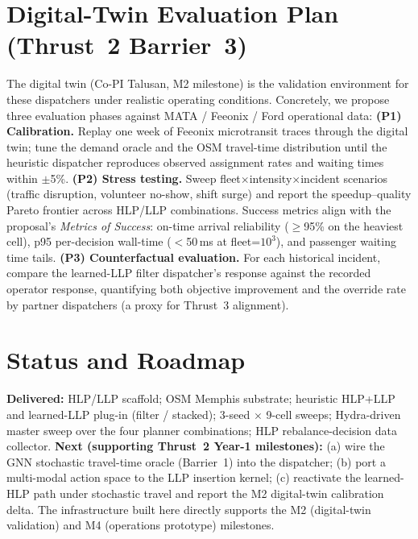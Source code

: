 \documentclass[11pt]{article}
\begin{document}
\section{Digital-Twin Evaluation Plan (Thrust~2 Barrier~3)}
The digital twin (Co-PI Talusan, M2 milestone) is the validation
environment for these dispatchers under realistic operating conditions.
Concretely, we propose three evaluation phases against MATA / Feeonix /
Ford operational data:
\textbf{(P1) Calibration.} Replay one week of Feeonix microtransit traces
through the digital twin; tune the demand oracle and the OSM travel-time
distribution until the heuristic dispatcher reproduces observed assignment
rates and waiting times within $\pm$5\%.
\textbf{(P2) Stress testing.} Sweep fleet$\times$intensity$\times$incident
scenarios (traffic disruption, volunteer no-show, shift surge) and report
the speedup--quality Pareto frontier across HLP/LLP combinations. Success
metrics align with the proposal's \textit{Metrics of Success}: on-time
arrival reliability ($\geq$95\% on the heaviest cell), p95 per-decision
wall-time ($<$50\,ms at fleet=$10^3$), and passenger waiting time tails.
\textbf{(P3) Counterfactual evaluation.} For each historical incident,
compare the learned-LLP filter dispatcher's response against the recorded
operator response, quantifying both objective improvement and the
override rate by partner dispatchers (a proxy for Thrust~3 alignment).

\section{Status and Roadmap}
\textbf{Delivered:} HLP/LLP scaffold; OSM Memphis substrate; heuristic
HLP+LLP and learned-LLP plug-in (filter / stacked); 3-seed
$\times$ 9-cell sweeps; Hydra-driven master sweep over the four planner
combinations; HLP rebalance-decision data collector. \textbf{Next
(supporting Thrust~2 Year-1 milestones):} (a) wire the GNN stochastic
travel-time oracle (Barrier~1) into the dispatcher; (b) port a
multi-modal action space to the LLP insertion kernel; (c) reactivate
the learned-HLP path under stochastic travel and report the M2 digital-twin
calibration delta. The infrastructure built here directly supports the M2
(digital-twin validation) and M4 (operations prototype) milestones.
\end{document}
